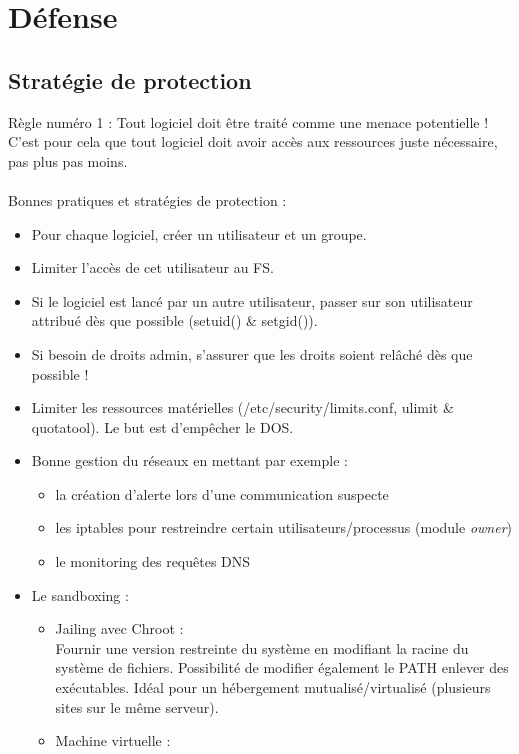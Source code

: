 \documentclass[a4paper]{article}
\begin{document}
\section{Défense}
\subsection{Stratégie de protection}
Règle numéro 1 : Tout logiciel doit être traité comme une menace potentielle ! C'est pour cela que tout logiciel doit avoir accès aux ressources juste nécessaire, pas plus pas moins.\\\\
Bonnes pratiques et stratégies de protection :
\begin{itemize}[label = \textbullet, font = \Large]
    \item Pour chaque logiciel, créer un utilisateur et un groupe.
    \item Limiter l'accès de cet utilisateur au FS.
    \item Si le logiciel est lancé par un autre utilisateur, passer sur son utilisateur attribué dès que possible (setuid() \& setgid()).
    \item Si besoin de droits admin, s'assurer que les droits soient relâché dès que possible !
    \item Limiter les ressources matérielles (/etc/security/limits.conf, ulimit \& quotatool). Le but est d'empêcher le DOS.
    \item Bonne gestion du réseaux en mettant par exemple :
    \begin{itemize}
        \item la création d'alerte lors d'une communication suspecte
        \item les iptables pour restreindre certain utilisateurs/processus (module \emph{owner})
        \item le monitoring des requêtes DNS
    \end{itemize}
    \item Le sandboxing :
    \begin{itemize}
        \item Jailing avec Chroot :\\
        Fournir une version restreinte du système en modifiant la racine du système de fichiers. Possibilité de modifier également le PATH enlever des exécutables. Idéal pour un hébergement mutualisé/virtualisé (plusieurs sites sur le même serveur).
        \item Machine virtuelle :\\

\end{itemize}
\end{itemize}
\end{document}

